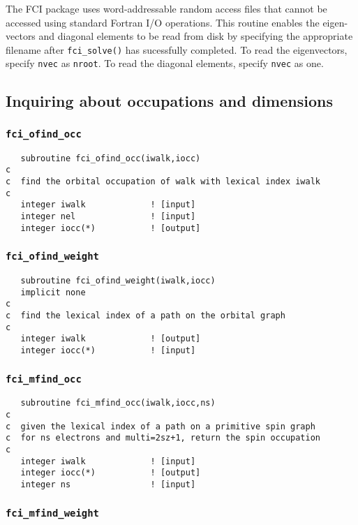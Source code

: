 \documentclass[fullpage,12pt,fleqn]{article}
\begin{document}
The FCI package uses word-addressable random access files that cannot
be accessed using standard Fortran I/O operations.  This routine
enables the eigen-vectors and diagonal elements to be read from disk
by specifying the appropriate filename after \verb!fci_solve()! has
sucessfully completed.  To read the eigenvectors, specify \verb!nvec!
as \verb!nroot!.  To read the diagonal elements, specify \verb!nvec!
as one.

\subsection{Inquiring about occupations and dimensions}

\subsubsection{{\tt fci\_ofind\_occ}}
\begin{verbatim}
   subroutine fci_ofind_occ(iwalk,iocc)
c  
c  find the orbital occupation of walk with lexical index iwalk
c     
   integer iwalk             ! [input]
   integer nel               ! [input]
   integer iocc(*)           ! [output]
\end{verbatim}

\subsubsection{{\tt fci\_ofind\_weight}}
\begin{verbatim}
   subroutine fci_ofind_weight(iwalk,iocc)
   implicit none
c     
c  find the lexical index of a path on the orbital graph
c     
   integer iwalk             ! [output]
   integer iocc(*)           ! [input]
\end{verbatim}

\subsubsection{{\tt fci\_mfind\_occ}}
\begin{verbatim}
   subroutine fci_mfind_occ(iwalk,iocc,ns)
c     
c  given the lexical index of a path on a primitive spin graph
c  for ns electrons and multi=2sz+1, return the spin occupation
c     
   integer iwalk             ! [input]
   integer iocc(*)           ! [output]
   integer ns                ! [input]
\end{verbatim}

\subsubsection{{\tt fci\_mfind\_weight}}
\end{document}
